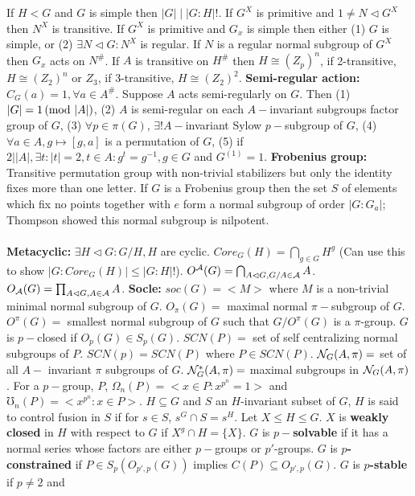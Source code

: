 If $H<G$ and $G$ is simple then $|G| \mid |G:H|!$. 
If $G^X$ is primitive and $1 \ne N \lhd G^X$ then $N^X$ is
transitive.  If $G^X$ is primitive and $G_x$ is simple then either (1) $G$ is simple, or
(2) $\exists N \lhd G: N^X$ is regular. If $N$ is a regular normal subgroup of
$G^X$ then $G_x$ acts on $N^\#$.  If $A$ is transitive on $H^\#$ then $H \cong (Z_p)^n$,
if 2-transitive, $H \cong (Z_2)^n$ or $Z_3$, if 3-transitive, $H \cong (Z_2)^2$.
{\bf Semi-regular action:}  $C_G(a)=1, \forall a \in A^{\#}$.  Suppose $A$ acts semi-regularly
on $G$.  Then (1) $|G| = 1 \thinspace \textnormal{(mod } |A| \textnormal{)}$, (2) $A$ is semi-regular on each $A-$invariant
subgroups factor group of $G$, (3) $\forall p \in \pi(G)$, $\exists! A-$invariant
Sylow $p-$subgroup of $G$, (4) $\forall a \in A, g \mapsto [g,a]$ is a permutation of
$G$, (5) if $2 | |A|, \exists t: |t|=2, t \in A: g^t = g^{-1}, g \in G$ and
$G^{(1)}=1$.
{\bf Frobenius group:} Transitive permutation group with non-trivial stabilizers
but only the identity fixes more than one letter.  If $G$ is a Frobenius group
then the set $S$ of elements which fix no points together with $e$ form a normal
subgroup of order $|G:G_a|$; Thompson showed this normal subgroup is nilpotent.\\
\\
{\bf Metacyclic:} $\exists H \lhd G: G/H ,H$ are cyclic. 
$Core_G(H)= \bigcap_{g \in G} H^g$ (Can use this to show $|G:Core_G(H)|\le |G:H|!$).
$O^{\cal A}(G)= \bigcap_{A \lhd G, G/A \in {\cal A}} A$.
$O_{\cal A}(G)= \prod_{A \lhd G, A \in {\cal A}} A$.
{\bf Socle:} $soc(G)= <M>$ where $M$ is a non-trivial minimal normal subgroup of $G$.
$O_{\pi}(G)=$ maximal normal $\pi-$subgroup of $G$.
$O^{\pi}(G)=$ smallest normal subgroup of $G$ such that $G/O^{\pi}(G)$ is a $\pi$-group.
$G$ is $p-$closed if $O_p(G) \in S_p(G)$.
$SCN(P)=$ set of self centralizing normal subgroups of $P$.
$SCN(p)= SCN(P)$ where $P \in SCN(P)$.
${\cal N}_G(A, \pi)=$ set of all $A-$ invariant $\pi$ subgroups of $G$.
${\cal N}_G^*(A, \pi)=$  maximal subgroups in ${\cal N}_G(A, \pi)$.  For a $p-$group, $P$,
$\Omega_n(P)= <x \in P: x^{p^n}=1>$ and
$\mho_n(P)= <x^{p^n}: x \in P>$.
$H \subseteq G$ and $S$ an $H$-invariant subset of $G$, $H$ is said to control fusion
in $S$ if for $s \in S$, $s^G \cap S = s^H$.
Let $X \le H \le G$.  $X$ is {\bf weakly closed} in $H$ with respect to $G$ if
$X^g \cap H = \{X\}$.
$G$ is {\bf $p-$solvable} if it has a normal series whose factors are either
$p-$groups or $p'$-groups.  
$G$ is {\bf $p$-constrained} if 
$P \in S_p ( O_{p',p} (G))$ implies $C(P) \subseteq O_{p',p} (G)$.
$G$ is {\bf $p$-stable} if $p \ne 2$ and 
